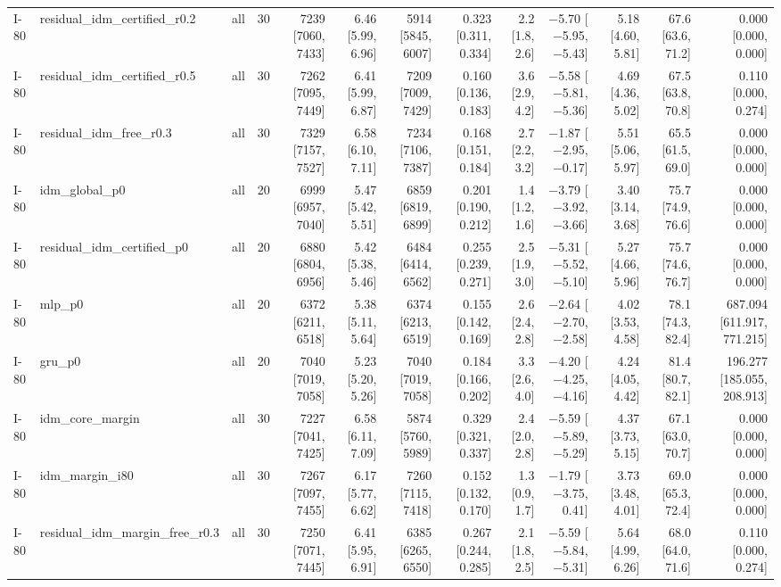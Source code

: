 \begin{table}[htbp]
{\begin{tabular}{lllrrrrrrrrrr}
I-80 & residual\_idm\_certified\_r0.2 & all & 30 & 7239 [7060, 7433] & 6.46 [5.99, 6.96] & 5914 [5845, 6007] & 0.323 [0.311, 0.334] & 2.2 [1.8, 2.6] & $-$5.70 [$-$5.95, $-$5.43] & 5.18 [4.60, 5.81] & 67.6 [63.6, 71.2] & 0.000 [0.000, 0.000] \\
I-80 & residual\_idm\_certified\_r0.5 & all & 30 & 7262 [7095, 7449] & 6.41 [5.99, 6.87] & 7209 [7009, 7429] & 0.160 [0.136, 0.183] & 3.6 [2.9, 4.2] & $-$5.58 [$-$5.81, $-$5.36] & 4.69 [4.36, 5.02] & 67.5 [63.8, 70.8] & 0.110 [0.000, 0.274] \\
I-80 & residual\_idm\_free\_r0.3 & all & 30 & 7329 [7157, 7527] & 6.58 [6.10, 7.11] & 7234 [7106, 7387] & 0.168 [0.151, 0.184] & 2.7 [2.2, 3.2] & $-$1.87 [$-$2.95, $-$0.17] & 5.51 [5.06, 5.97] & 65.5 [61.5, 69.0] & 0.000 [0.000, 0.000] \\
I-80 & idm\_global\_p0 & all & 20 & 6999 [6957, 7040] & 5.47 [5.42, 5.51] & 6859 [6819, 6899] & 0.201 [0.190, 0.212] & 1.4 [1.2, 1.6] & $-$3.79 [$-$3.92, $-$3.66] & 3.40 [3.14, 3.68] & 75.7 [74.9, 76.6] & 0.000 [0.000, 0.000] \\
I-80 & residual\_idm\_certified\_p0 & all & 20 & 6880 [6804, 6956] & 5.42 [5.38, 5.46] & 6484 [6414, 6562] & 0.255 [0.239, 0.271] & 2.5 [1.9, 3.0] & $-$5.31 [$-$5.52, $-$5.10] & 5.27 [4.66, 5.96] & 75.7 [74.6, 76.7] & 0.000 [0.000, 0.000] \\
I-80 & mlp\_p0 & all & 20 & 6372 [6211, 6518] & 5.38 [5.11, 5.64] & 6374 [6213, 6519] & 0.155 [0.142, 0.169] & 2.6 [2.4, 2.8] & $-$2.64 [$-$2.70, $-$2.58] & 4.02 [3.53, 4.58] & 78.1 [74.3, 82.4] & 687.094 [611.917, 771.215] \\
I-80 & gru\_p0 & all & 20 & 7040 [7019, 7058] & 5.23 [5.20, 5.26] & 7040 [7019, 7058] & 0.184 [0.166, 0.202] & 3.3 [2.6, 4.0] & $-$4.20 [$-$4.25, $-$4.16] & 4.24 [4.05, 4.42] & 81.4 [80.7, 82.1] & 196.277 [185.055, 208.913] \\
I-80 & idm\_core\_margin & all & 30 & 7227 [7041, 7425] & 6.58 [6.11, 7.09] & 5874 [5760, 5989] & 0.329 [0.321, 0.337] & 2.4 [2.0, 2.8] & $-$5.59 [$-$5.89, $-$5.29] & 4.37 [3.73, 5.15] & 67.1 [63.0, 70.7] & 0.000 [0.000, 0.000] \\
I-80 & idm\_margin\_i80 & all & 30 & 7267 [7097, 7455] & 6.17 [5.77, 6.62] & 7260 [7115, 7418] & 0.152 [0.132, 0.170] & 1.3 [0.9, 1.7] & $-$1.79 [$-$3.75, 0.41] & 3.73 [3.48, 4.01] & 69.0 [65.3, 72.4] & 0.000 [0.000, 0.000] \\
I-80 & residual\_idm\_margin\_free\_r0.3 & all & 30 & 7250 [7071, 7445] & 6.41 [5.95, 6.91] & 6385 [6265, 6550] & 0.267 [0.244, 0.285] & 2.1 [1.8, 2.5] & $-$5.59 [$-$5.84, $-$5.31] & 5.64 [4.99, 6.26] & 68.0 [64.0, 71.6] & 0.110 [0.000, 0.274] \\

\end{tabular}}
\end{table}
